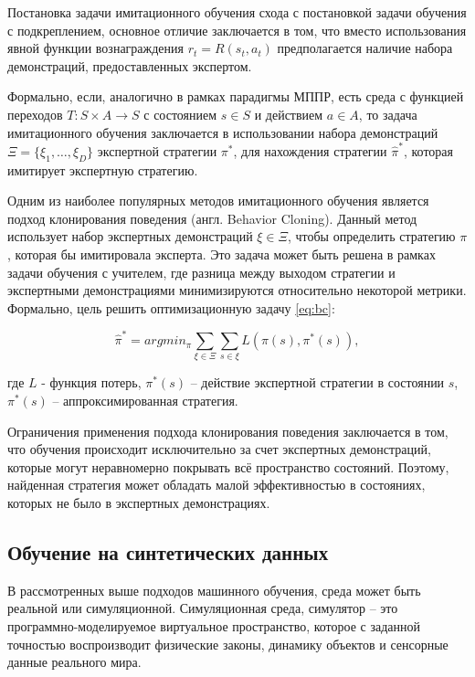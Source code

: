         Постановка задачи имитационного обучения схода с постановкой задачи обучения с подкреплением, основное отличие заключается в том, что вместо использования явной функции вознаграждения $r_t = R(s_t, a_t)$ предполагается наличие набора демонстраций, предоставленных экспертом.

        Формально, если, аналогично в рамках парадигмы МППР, есть среда с функцией переходов $T: S \times A \to S$ с состоянием $s \in S$ и действием $a \in A$, то задача имитационного обучения заключается в использовании набора демонстраций $\Xi = \{ \xi_1, \dots, \xi_D\}$ экспертной стратегии $\pi^*$, для нахождения стратегии $\hat{\pi}^*$, которая имитирует экспертную стратегию.

        Одним из наиболее популярных методов имитационного обучения является подход клонирования поведения (англ. Behavior Cloning). Данный метод использует набор экспертных демонстраций $\xi \in \Xi$, чтобы определить стратегию $\pi$, которая бы имитировала эксперта. Это задача может быть решена в рамках задачи обучения с учителем, где разница между выходом стратегии и экспертными демонстрациями минимизируются относительно некоторой метрики. Формально, цель решить оптимизационную задачу \ref{eq:bc}:

        \begin{equation}
            \hat{\pi}^* = argmin_{\pi} \sum_{\xi \in \Xi} \sum_{s \in \xi} L (\pi(s), \pi^*(s)),
            \label{eq:bc}
        \end{equation}

        где $L$ - функция потерь, $\pi^*(s)$ -- действие экспертной стратегии в состоянии $s$, $\pi^* (s)$ -- аппроксимированная стратегия. 

        Ограничения применения подхода клонирования поведения заключается в том, что обучения происходит исключительно за счет экспертных демонстраций, которые могут неравномерно покрывать всё пространство состояний. Поэтому, найденная стратегия может обладать малой эффективностью в состояниях, которых не было в экспертных демонстрациях.
        

    \subsection{Обучение на синтетических данных}

        В рассмотренных выше подходов машинного обучения, среда может быть реальной или симуляционной. Симуляционная среда, симулятор -- это программно-моделируемое виртуальное пространство, которое с заданной точностью воспроизводит физические законы, динамику объектов и сенсорные данные реального мира.
    
